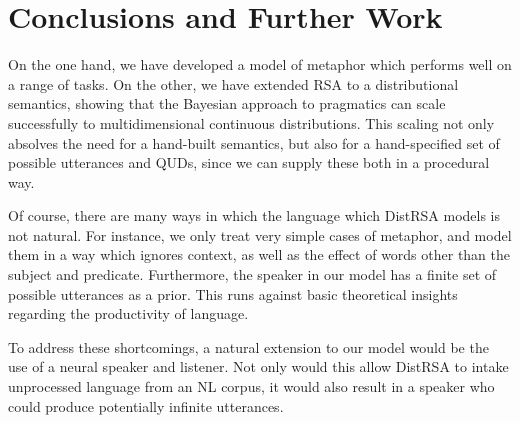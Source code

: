 \documentclass[10pt,letterpaper,twocolumn]{article}
\begin{document}



%
%
%



\section{Conclusions and Further Work}

On the one hand, we have developed a model of metaphor which performs well on a range of tasks. On the other, we have extended RSA to a distributional semantics, showing that the Bayesian approach to pragmatics can scale successfully to multidimensional continuous distributions. This scaling not only absolves the need for a hand-built semantics, but also for a hand-specified set of possible utterances and QUDs, since we can supply these both in a procedural way.

Of course, there are many ways in which the language which DistRSA models is not natural. For instance, we only treat very simple cases of metaphor, and model them in a way which ignores context, as well as the effect of words other than the subject and predicate. Furthermore, the speaker in our model has a finite set of possible utterances as a prior. This runs against basic theoretical insights regarding the productivity of language.

To address these shortcomings, a natural extension to our model would be the use of a neural speaker and listener. Not only would this allow DistRSA to intake unprocessed language from an NL corpus, it would also result in a speaker who could produce potentially infinite utterances.

\printbibliography
\end{document}
